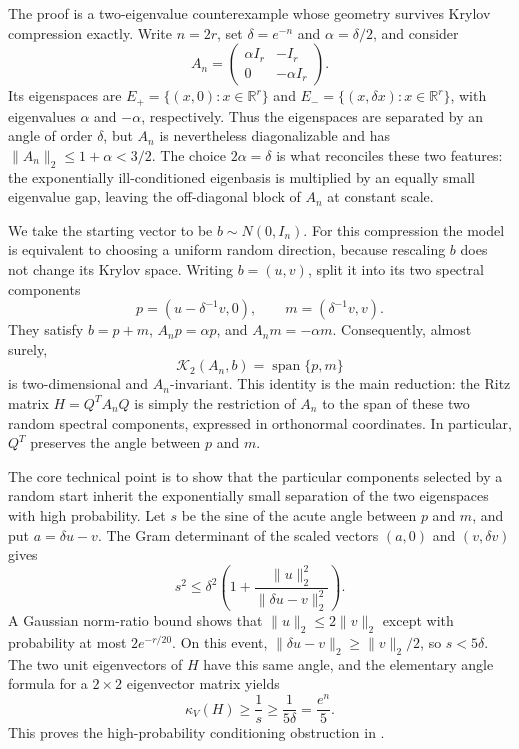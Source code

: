 \documentclass[11pt]{article}
\begin{document}
The proof is a two-eigenvalue counterexample whose geometry survives Krylov
compression exactly.  Write $n=2r$, set
$\delta=e^{-n}$ and $\alpha=\delta/2$, and consider
\begin{equation}
  A_n=
  \begin{pmatrix}
    \alpha I_r&-I_r\\
    0&-\alpha I_r
  \end{pmatrix}.
  \label{eq:overview-input}
\end{equation}
Its eigenspaces are
$E_+=\{(x,0):x\in\mathbb R^r\}$ and
$E_-=\{(x,\delta x):x\in\mathbb R^r\}$, with eigenvalues
$\alpha$ and $-\alpha$, respectively.  Thus the eigenspaces are separated by
an angle of order $\delta$, but $A_n$ is nevertheless diagonalizable and has
$\lVert A_n\rVert_2\leq1+\alpha<3/2$.  The choice
$2\alpha=\delta$ is what reconciles these two features: the exponentially
ill-conditioned eigenbasis is multiplied by an equally small eigenvalue gap,
leaving the off-diagonal block of $A_n$ at constant scale.

We take the starting vector to be $b\sim N(0,I_n)$.  For this compression the
model is equivalent to choosing a uniform random direction, because rescaling
$b$ does not change its Krylov space.  Writing $b=(u,v)$, split it into its two
spectral components
\begin{equation}
  p=(u-\delta^{-1}v,0),
  \qquad
  m=(\delta^{-1}v,v).
  \label{eq:overview-components}
\end{equation}
They satisfy $b=p+m$, $A_np=\alpha p$, and $A_nm=-\alpha m$.  Consequently,
almost surely,
\begin{equation}
  \mathcal K_2(A_n,b)=\operatorname{span}\{p,m\}
  \label{eq:overview-krylov}
\end{equation}
is two-dimensional and $A_n$-invariant.  This identity is the main reduction:
the Ritz matrix $H=Q^TA_nQ$ is simply the restriction of $A_n$ to the span of
these two random spectral components, expressed in orthonormal coordinates.
In particular, $Q^T$ preserves the angle between $p$ and $m$.

The core technical point is to show that the particular components selected by
a random start inherit the exponentially small separation of the two
eigenspaces with high probability.  Let $s$ be the sine of the acute angle
between $p$ and $m$, and put $a=\delta u-v$.  The Gram determinant of the
scaled vectors $(a,0)$ and $(v,\delta v)$ gives
\begin{equation}
  s^2\leq \delta^2\left(1+
  \frac{\lVert u\rVert_2^2}{\lVert\delta u-v\rVert_2^2}\right).
  \label{eq:overview-angle}
\end{equation}
A Gaussian norm-ratio bound shows that
$\lVert u\rVert_2\leq2\lVert v\rVert_2$ except with probability at most
$2e^{-r/20}$.  On this event,
$\lVert\delta u-v\rVert_2\geq\lVert v\rVert_2/2$, so
$s<5\delta$.  The two unit eigenvectors of $H$ have this same angle, and the
elementary angle formula for a $2\times2$ eigenvector matrix yields
\begin{equation}
  \kappa_V(H)\geq\frac1s\geq\frac1{5\delta}
  =\frac{e^n}{5}.
  \label{eq:overview-conditioning}
\end{equation}
This proves the high-probability conditioning obstruction in
.
\end{document}
